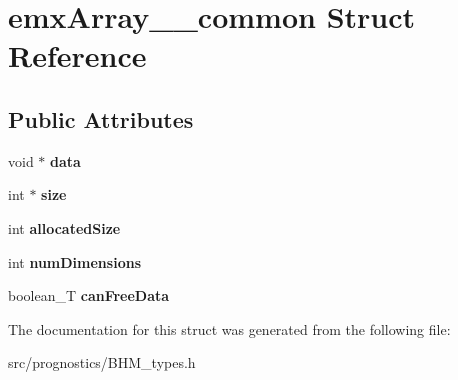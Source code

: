 \hypertarget{structemxArray____common}{}\section{emx\+Array\+\_\+\+\_\+common Struct Reference}
\label{structemxArray____common}
\subsection*{Public Attributes}
\begin{DoxyCompactItemize}
\item 
\mbox{\label{structemxArray____common_a191f1caf951b27e7b138f8139f9e3cce}} 
void $\ast$ {\bfseries data}
\item 
\mbox{\label{structemxArray____common_ae6a2d7c16fb0cd155069ede4de533589}} 
int $\ast$ {\bfseries size}
\item 
\mbox{\label{structemxArray____common_a697633de37c1ab9ecf0da2ccd223f4a0}} 
int {\bfseries allocated\+Size}
\item 
\mbox{\label{structemxArray____common_a8c71cd2fa104f959c8c63298f8087911}} 
int {\bfseries num\+Dimensions}
\item 
\mbox{\label{structemxArray____common_aeb238f32950a592e4621bab2ec3a01cf}} 
boolean\+\_\+T {\bfseries can\+Free\+Data}
\end{DoxyCompactItemize}


The documentation for this struct was generated from the following file\+:\begin{DoxyCompactItemize}
\item 
src/prognostics/B\+H\+M\+\_\+types.\+h\end{DoxyCompactItemize}
